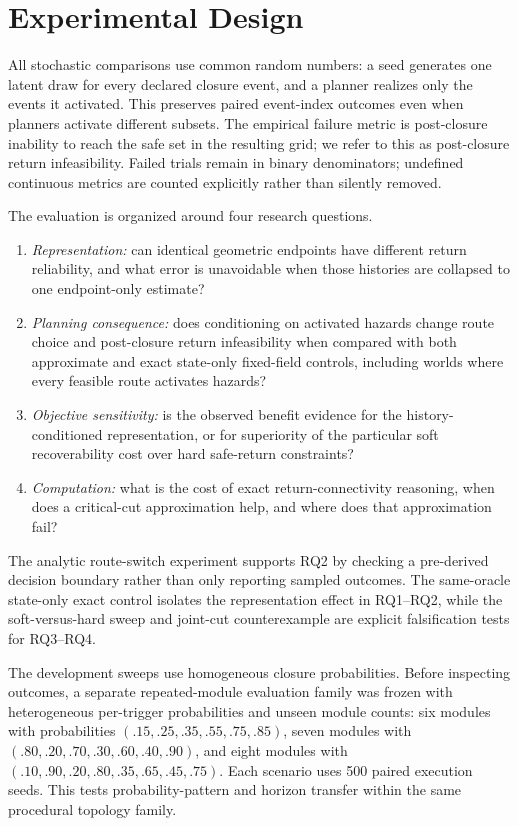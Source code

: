 \documentclass[conference]{IEEEtran}
\begin{document}
\section{Experimental Design}
All stochastic comparisons use common random numbers: a seed generates one latent draw for every declared closure event, and a planner realizes only the events it activated. This preserves paired event-index outcomes even when planners activate different subsets. The empirical failure metric is post-closure inability to reach the safe set in the resulting grid; we refer to this as post-closure return infeasibility. Failed trials remain in binary denominators; undefined continuous metrics are counted explicitly rather than silently removed.

The evaluation is organized around four research questions.
\begin{enumerate}
  \item[\textbf{RQ1}] \emph{Representation:} can identical geometric endpoints have different return reliability, and what error is unavoidable when those histories are collapsed to one endpoint-only estimate?
  \item[\textbf{RQ2}] \emph{Planning consequence:} does conditioning on activated hazards change route choice and post-closure return infeasibility when compared with both approximate and exact state-only fixed-field controls, including worlds where every feasible route activates hazards?
  \item[\textbf{RQ3}] \emph{Objective sensitivity:} is the observed benefit evidence for the history-conditioned representation, or for superiority of the particular soft recoverability cost over hard safe-return constraints?
  \item[\textbf{RQ4}] \emph{Computation:} what is the cost of exact return-connectivity reasoning, when does a critical-cut approximation help, and where does that approximation fail?
\end{enumerate}

The analytic route-switch experiment supports RQ2 by checking a pre-derived decision boundary rather than only reporting sampled outcomes. The same-oracle state-only exact control isolates the representation effect in RQ1--RQ2, while the soft-versus-hard sweep and joint-cut counterexample are explicit falsification tests for RQ3--RQ4.

The development sweeps use homogeneous closure probabilities. Before inspecting outcomes, a separate repeated-module evaluation family was frozen with heterogeneous per-trigger probabilities and unseen module counts: six modules with probabilities $(.15,.25,.35,.55,.75,.85)$, seven modules with $(.80,.20,.70,.30,.60,.40,.90)$, and eight modules with $(.10,.90,.20,.80,.35,.65,.45,.75)$. Each scenario uses 500 paired execution seeds. This tests probability-pattern and horizon transfer within the same procedural topology family.
\end{document}
